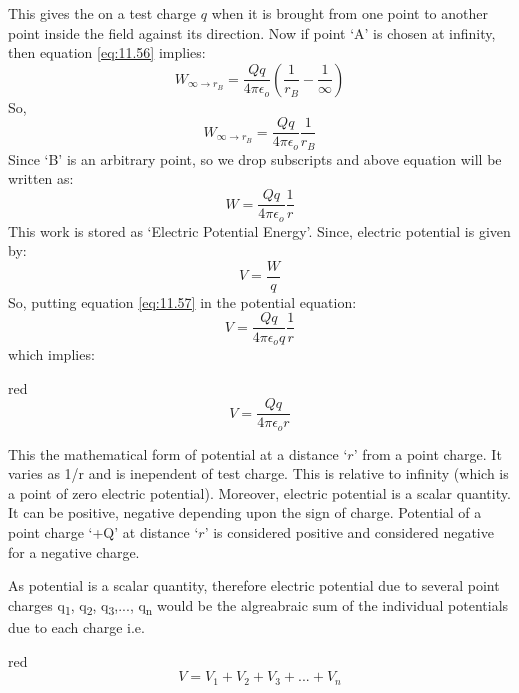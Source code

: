 This gives the on a test charge $q$ when it is brought from one
point to another point inside the field against its direction. Now if point `A'
is chosen at infinity, then equation \ref{eq:11.56} implies:
\begin{equation}
  W_{\infty\rightarrow r_{B}} = \frac{Qq}{4\pi\epsilon_{o} } (\frac{1}{r_{B}} - \frac{1}{\infty}) \nonumber
\end{equation}
So,
\begin{equation}
  W_{\infty\rightarrow r_{B}} = \frac{Qq}{4\pi\epsilon_{o} } \frac{1}{r_{B}} \nonumber
\end{equation}
Since `B' is an arbitrary point, so we drop subscripts and above equation will
be written as:
\begin{equation}\label{eq:11.57}
  W = \frac{Qq}{4\pi\epsilon_{o} } \frac{1}{r}
\end{equation}
This work is stored as `Electric Potential Energy'. Since, electric potential is given by:
\begin{equation}
  V = \frac{W}{q} \nonumber
\end{equation}
So, putting equation \ref{eq:11.57} in the potential equation:
\begin{equation}
  V = \frac{Qq}{4\pi\epsilon_{o} q} \frac{1}{r} \nonumber
\end{equation}
which implies:
\begin{mybox}{red}{}
\begin{equation}\label{eq:11.58}
  V = \frac{Qq}{4\pi\epsilon_{o}r} 
\end{equation}
\end{mybox}
This the mathematical form of potential at a distance `$r$' from a
point charge. It varies as 1/r and is inependent of test charge.
This is relative to infinity (which is a point of zero electric potential).
Moreover, electric potential is a scalar quantity. It can be positive,
negative depending upon the sign of charge. Potential of a point charge ‘+Q’
at distance `$r$' is considered positive and considered negative for a
negative charge.

As potential is a scalar quantity, therefore electric potential due to
several point charges q\textsubscript{1}, q\textsubscript{2}, q\textsubscript{3},..., q\textsubscript{n}
would be the algreabraic sum of the individual potentials due to each
charge i.e.
\begin{mybox}{red}{}
\begin{equation}
  V = V_{1} +V_{2} + V_{3} + ... + V_{n}
\end{equation}
\end{mybox}
